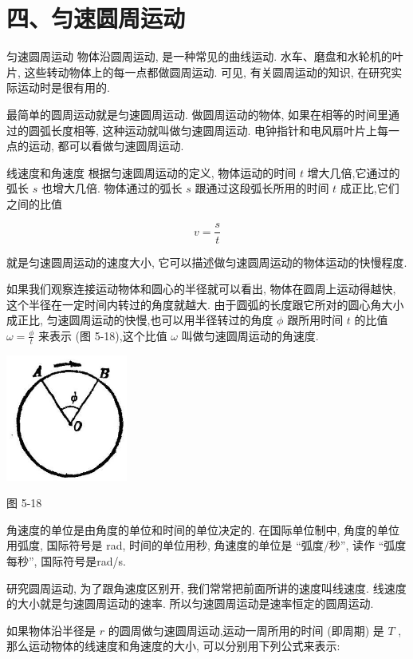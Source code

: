 \documentclass[10pt]{article}
\begin{document}
\section*{四、匀速圆周运动}

匀速圆周运动 物体沿圆周运动, 是一种常见的曲线运动. 水车、磨盘和水轮机的叶片, 这些转动物体上的每一点都做圆周运动. 可见, 有关圆周运动的知识, 在研究实际运动时是很有用的.

最简单的圆周运动就是匀速圆周运动. 做圆周运动的物体, 如果在相等的时间里通过的圆弧长度相等, 这种运动就叫做匀速圆周运动. 电钟指针和电风扇叶片上每一点的运动, 都可以看做匀速圆周运动.

线速度和角速度 根据匀速圆周运动的定义, 物体运动的时间 \(t\) 增大几倍,它通过的弧长 \(s\) 也增大几倍. 物体通过的弧长 \(s\) 跟通过这段弧长所用的时间 \(t\) 成正比,它们之间的比值

\[
v = \frac{s}{t}
\]

就是匀速圆周运动的速度大小, 它可以描述做匀速圆周运动的物体运动的快慢程度.

如果我们观察连接运动物体和圆心的半径就可以看出, 物体在圆周上运动得越快, 这个半径在一定时间内转过的角度就越大. 由于圆弧的长度跟它所对的圆心角大小成正比, 匀速圆周运动的快慢,也可以用半径转过的角度 \(\phi\) 跟所用时间 \(t\) 的比值 \(\omega = \frac{\phi }{t}\) 来表示 (图 5-18),这个比值 \(\omega\) 叫做匀速圆周运动的角速度.

\begin{center}
\includegraphics[max width=0.3\textwidth]{images/01912d55-147c-70aa-b0e0-1782a122f948_142_819678.jpg}
\end{center}

图 5-18

角速度的单位是由角度的单位和时间的单位决定的. 在国际单位制中, 角度的单位用弧度, 国际符号是 rad, 时间的单位用秒, 角速度的单位是 “弧度/秒”, 读作 “弧度每秒”, 国际符号是rad/s.

研究圆周运动, 为了跟角速度区别开, 我们常常把前面所讲的速度叫线速度. 线速度的大小就是匀速圆周运动的速率. 所以匀速圆周运动是速率恒定的圆周运动.

如果物体沿半径是 \(r\) 的圆周做匀速圆周运动,运动一周所用的时间 (即周期) 是 \(T\) ,那么运动物体的线速度和角速度的大小, 可以分别用下列公式来表示:
\end{document}
